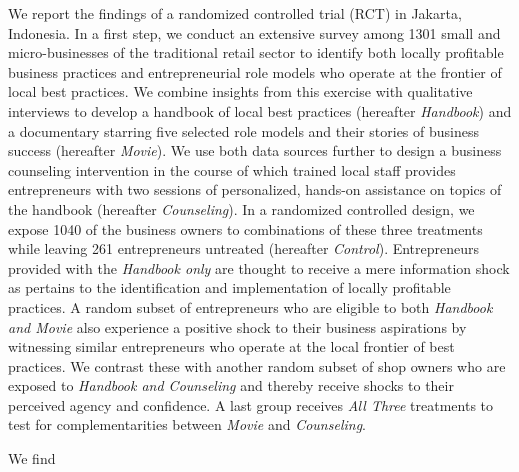 \documentclass[11.5pt]{article}
\begin{document}
We report the findings of a randomized controlled trial (RCT) in Jakarta, Indonesia. In a first step, we conduct an extensive survey among 1301 small and micro-businesses of the traditional retail sector to identify both locally profitable business practices and entrepreneurial role models who operate at the frontier of local best practices. We combine insights from this exercise with qualitative interviews to develop a handbook of local best practices (hereafter \emph{Handbook}) and a documentary starring five selected role models and their stories of business success (hereafter \emph{Movie}). We use both data sources further to design a business counseling intervention in the course of which trained local staff provides entrepreneurs with two sessions of personalized, hands-on assistance on topics of the handbook (hereafter \emph{Counseling}). In a randomized controlled design, we expose 1040 of the business owners to combinations of these three treatments while leaving 261 entrepreneurs untreated (hereafter \emph{Control}). Entrepreneurs provided with the \emph{Handbook only} are thought to receive a mere information shock as pertains to the identification and implementation of locally profitable practices. A random subset of entrepreneurs who are eligible to both \emph{Handbook and Movie} also experience a positive shock to their business aspirations by witnessing similar entrepreneurs who operate at the local frontier of best practices. We contrast these with another random subset of shop owners who are exposed to \emph{Handbook and Counseling} and thereby receive shocks to their perceived agency and confidence. A last group receives \emph{All Three} treatments to test for complementarities between \emph{Movie} and \emph{Counseling}.

We find
\end{document}
